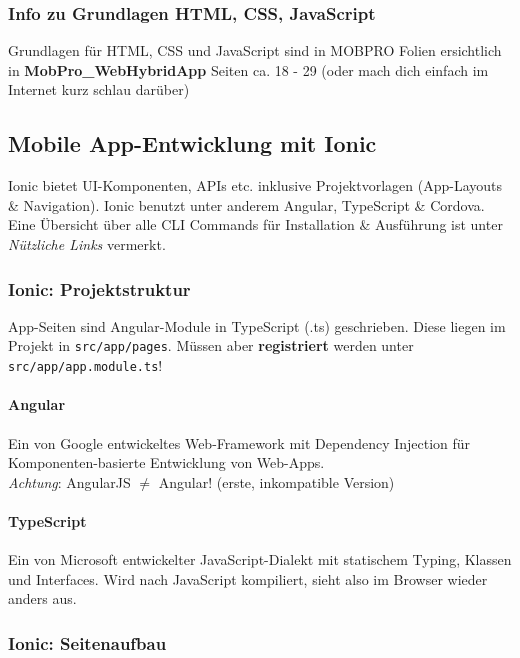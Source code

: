 \documentclass[a4paper]{article}
\begin{document}
		\subsubsection{Info zu Grundlagen HTML, CSS, JavaScript}
		
		Grundlagen für HTML, CSS und JavaScript sind in MOBPRO Folien ersichtlich in \textbf{MobPro\_WebHybridApp} Seiten ca. 18 - 29 (oder mach dich einfach im Internet kurz schlau darüber)
		
	\subsection{Mobile App-Entwicklung mit Ionic}
	
	Ionic bietet UI-Komponenten, APIs etc. inklusive Projektvorlagen (App-Layouts \& Navigation).
	Ionic benutzt unter anderem Angular, TypeScript \& Cordova.
	Eine Übersicht über alle CLI Commands für Installation \& Ausführung ist unter \textit{Nützliche Links} vermerkt.
	
		\subsubsection{Ionic: Projektstruktur}
		
		App-Seiten sind Angular-Module in TypeScript (.ts) geschrieben.
		Diese liegen im Projekt in \texttt{src/app/pages}.
		Müssen aber \textbf{registriert} werden unter \texttt{src/app/app.module.ts}!
		
			\paragraph{Angular}
			
			Ein von Google entwickeltes Web-Framework mit Dependency Injection für Komponenten-basierte Entwicklung von Web-Apps.\\
			\textit{Achtung}: AngularJS $\neq$ Angular! (erste, inkompatible Version)
			
			\paragraph{TypeScript}
			
			Ein von Microsoft entwickelter JavaScript-Dialekt mit statischem Typing, Klassen und Interfaces.
			Wird nach JavaScript kompiliert, sieht also im Browser wieder anders aus.
			
		\subsubsection{Ionic: Seitenaufbau}
		
\end{document}
